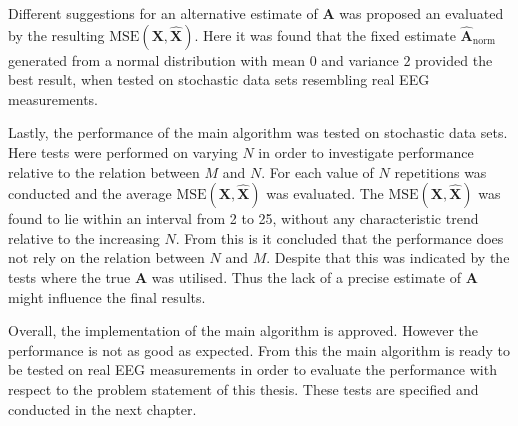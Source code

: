Different suggestions for an alternative estimate of $\mathbf{A}$ was proposed an evaluated by the resulting $\text{MSE}(\mathbf{X}, \hat{\mathbf{X}})$. 
Here it was found that the fixed estimate $\hat{\mathbf{A}}_{\text{norm}}$ generated from a normal distribution with mean $0$ and variance $2$ provided the best result, when tested on stochastic data sets resembling real EEG measurements. 

Lastly, the performance of the main algorithm was tested on stochastic data sets. 
Here tests were performed on varying $N$ in order to investigate performance relative to the relation between $M$ and $N$. 
For each value of $N$ repetitions was conducted and the average $\text{MSE}(\mathbf{X}, \hat{\mathbf{X}})$ was evaluated. 
The $\text{MSE}(\mathbf{X}, \hat{\mathbf{X}})$ was found to lie within an interval from 2 to 25, without any characteristic trend relative to the increasing $N$. 
From this is it concluded that the performance does not rely on the relation between $N$ and $M$. 
Despite that this was indicated by the tests where the true $\mathbf{A}$ was utilised. 
Thus the lack of a precise estimate of $\mathbf{A}$ might influence the final results. 

Overall, the implementation of the main algorithm is approved. 
However the performance is not as good as expected. 
From this the main algorithm is ready to be tested on real EEG measurements in order to evaluate the performance with respect to the problem statement of this thesis. These tests are specified and conducted in the next chapter. 
